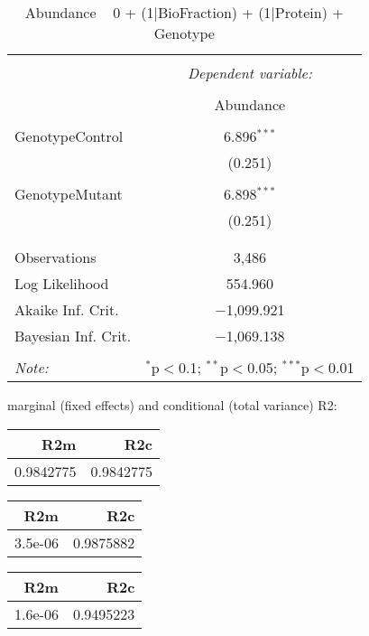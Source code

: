 \documentclass[11pt]{report}
\begin{document}
\begin{table}[!htbp] \centering 
  \caption{Abundance ~ 0 + (1|BioFraction) + (1|Protein) + Genotype} 
  \label{} 
\begin{tabular}{@{\extracolsep{5pt}}lc} 
\\[-1.8ex]\hline 
\hline \\[-1.8ex] 
 & \multicolumn{1}{c}{\textit{Dependent variable:}} \\ 
\cline{2-2} 
\\[-1.8ex] & Abundance \\ 
\hline \\[-1.8ex] 
 GenotypeControl & 6.896$^{***}$ \\ 
  & (0.251) \\ 
  & \\ 
 GenotypeMutant & 6.898$^{***}$ \\ 
  & (0.251) \\ 
  & \\ 
\hline \\[-1.8ex] 
Observations & 3,486 \\ 
Log Likelihood & 554.960 \\ 
Akaike Inf. Crit. & $-$1,099.921 \\ 
Bayesian Inf. Crit. & $-$1,069.138 \\ 
\hline 
\hline \\[-1.8ex] 
\textit{Note:}  & \multicolumn{1}{r}{$^{*}$p$<$0.1; $^{**}$p$<$0.05; $^{***}$p$<$0.01} \\ 
\end{tabular} 
\end{table} 
marginal (fixed effects) and conditional (total variance) R2:

\begin{tabular}{r|r}
\hline
R2m & R2c\\
\hline
0.9842775 & 0.9842775\\
\hline
\end{tabular}

\begin{tabular}{r|r}
\hline
R2m & R2c\\
\hline
3.5e-06 & 0.9875882\\
\hline
\end{tabular}

\begin{tabular}{r|r}
\hline
R2m & R2c\\
\hline
1.6e-06 & 0.9495223\\
\hline
\end{tabular}
\end{document}
